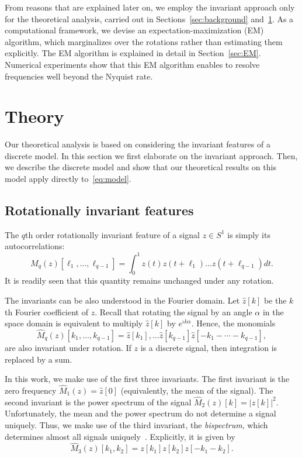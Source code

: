 \documentclass[english,12pt]{article}
\newcommand{\I}{\iota}
\numberwithin{equation}{section}
\numberwithin{thm}{section} %
\begin{document}
From reasons that are explained later on, we employ the invariant approach only for the theoretical analysis, carried out in Sections~\ref{sec:background} and~\ref{sec:theory}. As a computational framework, we devise an expectation-maximization (EM) algorithm, which marginalizes over the rotations rather than estimating them explicitly.  The EM algorithm is explained in detail in Section~\ref{sec:EM}.
Numerical experiments show that this EM algorithm enables to resolve frequencies well beyond the Nyquist rate.

\section{Theory} \label{sec:theory}

Our theoretical analysis is based on considering the invariant features of a discrete model. In this section we first elaborate on the invariant approach. Then, we describe the discrete model and show that our theoretical results on this model apply directly to~\eqref{eq:model}.

\subsection{Rotationally invariant features} \label{sec:invariants}

The $q$th order rotationally invariant feature of a signal $z\in S^1$ is simply its autocorrelations:
\begin{equation}
M_q(z)[\ell_1,\ldots,\ell_{q-1}]=\int_{0}^1 z(t)z(t+\ell_1)\ldots z(t+\ell_{q-1})dt.
\end{equation} 
It is readily seen that this quantity remains unchanged under any rotation. 

The invariants  can be also understood in the Fourier domain.
Let ${\hat{z}[k]}$ be the $k$th Fourier coefficient of $z$. Recall that rotating the signal by an angle $\alpha$ in the space domain is equivalent to multiply ${\hat{z}[k]}$ by $e^{\I k\alpha}$. Hence, the monomials
\begin{equation}
\hat{M}_q(z)[k_1,\ldots,k_{q-1}]=\hat{z}[k_1],\ldots \hat{z}[k_{q-1}]{\hat{z}[-k_1-\cdots-k_{q-1}]},
\end{equation} 
are also invariant under rotation. If $z$ is a discrete signal, then integration is replaced by a sum.

In this work, we make use of the first three invariants. The first invariant is the zero frequency $\hat{M}_1(z) = \hat{z}[0]$ (equivalently, the mean of the signal). The second invariant is the power spectrum of the signal $\hat{M}_2(z)[k]=|z[k]|^2$. Unfortunately, the mean and the power spectrum do not determine a signal uniquely. 
Thus, we make use of the third invariant, the \emph{bispectrum}, which determines almost all signals uniquely~\cite{tukey1953spectral,sadler1992shift}. Explicitly, it is given by
\begin{equation}
\hat{M}_3(z)[k_1,k_2] = z[k_1]z[k_2]z[-k_1-k_2].
\end{equation}
\end{document}
